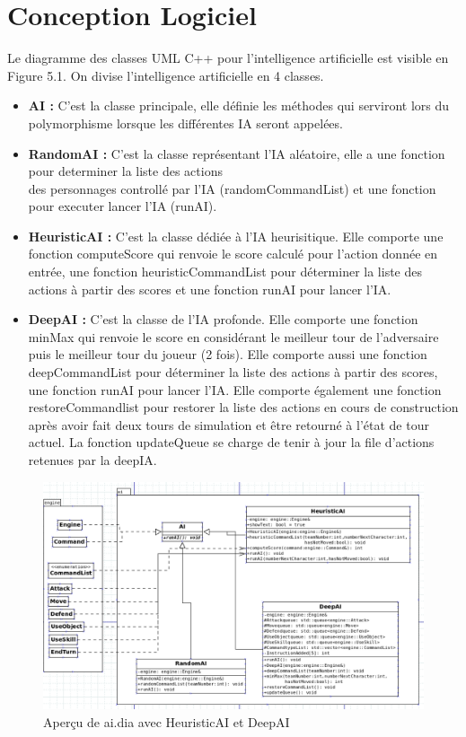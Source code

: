 \section{Conception Logiciel}
Le diagramme des classes UML C++ pour l'intelligence artificielle est
visible en Figure 5.1.
On divise l'intelligence artificielle en 4 classes.
\\
\begin{itemize}

\item \textbf{AI :} C'est la classe principale, elle définie les 
méthodes qui serviront lors du polymorphisme lorsque les 
différentes IA seront appelées.
\\
\item \textbf{RandomAI :} C'est la classe représentant l'IA 
aléatoire, elle a une fonction pour determiner la liste des actions \\
des personnages controllé par l'IA (randomCommandList) et une 
fonction pour executer lancer l'IA (runAI).
\\
\item \textbf{HeuristicAI :} C'est la classe dédiée à l'IA heurisitique.
Elle comporte une fonction computeScore qui renvoie le score calculé
pour l'action donnée en entrée, une fonction heuristicCommandList pour
déterminer la liste des actions à partir des scores et une fonction
runAI pour lancer l'IA.
\\
\item \textbf{DeepAI :} C'est la classe de l'IA profonde. Elle comporte 
une fonction minMax qui renvoie le score en considérant le meilleur tour
de l'adversaire puis le meilleur tour du joueur (2 fois). 
Elle comporte aussi une fonction deepCommandList pour déterminer la liste des actions 
à partir des scores, une fonction runAI pour lancer l'IA.
Elle comporte également une fonction restoreCommandlist pour restorer 
la liste des actions en cours de construction après avoir fait deux tours 
de simulation et être retourné à l'état de tour actuel. La fonction updateQueue 
se charge de tenir à jour la file d'actions retenues par la deepIA.

\end{itemize}


\begin{figure}[H]
\includegraphics[width=\linewidth]{images/deep_ai_dia.png}
\centering
\caption{Aperçu de ai.dia avec HeuristicAI et DeepAI}
\label{fig:img3}
\end{figure}
\newpage
